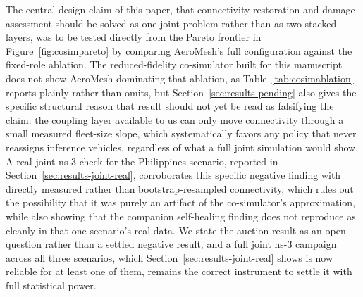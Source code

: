\documentclass[drones,article,submit,moreauthors]{Definitions/mdpi}
\begin{document}
The central design claim of this paper, that connectivity restoration and damage assessment should be solved as one joint problem rather than as two stacked layers, was to be tested directly from the Pareto frontier in Figure~\ref{fig:cosimpareto} by comparing AeroMesh's full configuration against the fixed-role ablation. The reduced-fidelity co-simulator built for this manuscript does not show AeroMesh dominating that ablation, as Table~\ref{tab:cosimablation} reports plainly rather than omits, but Section~\ref{sec:results-pending} also gives the specific structural reason that result should not yet be read as falsifying the claim: the coupling layer available to us can only move connectivity through a small measured fleet-size slope, which systematically favors any policy that never reassigns inference vehicles, regardless of what a full joint simulation would show. A real joint ns-3 check for the Philippines scenario, reported in Section~\ref{sec:results-joint-real}, corroborates this specific negative finding with directly measured rather than bootstrap-resampled connectivity, which rules out the possibility that it was purely an artifact of the co-simulator's approximation, while also showing that the companion self-healing finding does not reproduce as cleanly in that one scenario's real data. We state the auction result as an open question rather than a settled negative result, and a full joint ns-3 campaign across all three scenarios, which Section~\ref{sec:results-joint-real} shows is now reliable for at least one of them, remains the correct instrument to settle it with full statistical power.
\end{document}
